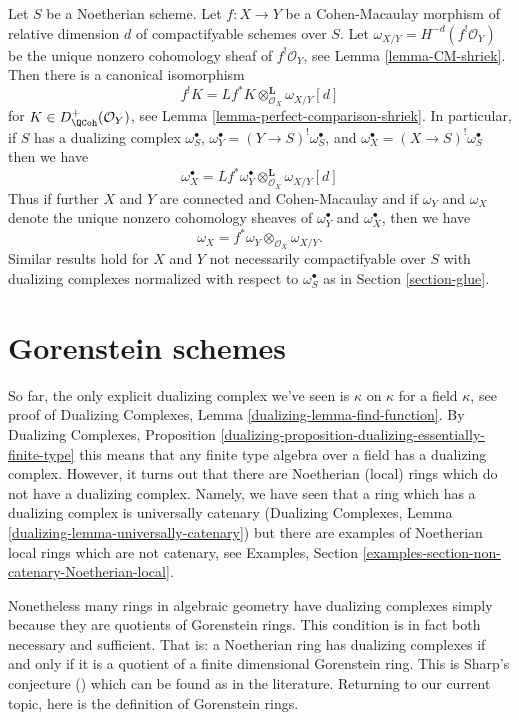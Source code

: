 \begin{remark}
\label{remark-CM-morphism-compare-dualizing}
Let $S$ be a Noetherian scheme. Let $f : X \to Y$ be a
Cohen-Macaulay morphism of relative dimension $d$
of compactifyable schemes over $S$.
Let $\omega_{X/Y} = H^{-d}(f^!\mathcal{O}_Y)$
be the unique nonzero cohomology sheaf of $f^!\mathcal{O}_Y$, see
Lemma \ref{lemma-CM-shriek}.
Then there is a canonical isomorphism
$$
f^!K = Lf^*K \otimes_{\mathcal{O}_X}^\mathbf{L} \omega_{X/Y}[d]
$$
for $K \in D^+_\QCoh(\mathcal{O}_Y)$, see
Lemma \ref{lemma-perfect-comparison-shriek}. In particular, if
$S$ has a dualizing complex $\omega_S^\bullet$,
$\omega_Y^\bullet = (Y \to S)^!\omega_S^\bullet$, and
$\omega_X^\bullet = (X \to S)^!\omega_S^\bullet$
then we have
$$
\omega_X^\bullet =
Lf^*\omega_Y^\bullet \otimes_{\mathcal{O}_X}^\mathbf{L} \omega_{X/Y}[d]
$$
Thus if further $X$ and $Y$ are connected and Cohen-Macaulay and
if $\omega_Y$ and $\omega_X$ denote the unique nonzero cohomology
sheaves of $\omega_Y^\bullet$ and $\omega_X^\bullet$, then we
have
$$
\omega_X = f^*\omega_Y \otimes_{\mathcal{O}_X} \omega_{X/Y}.
$$
Similar results hold for $X$ and $Y$ not necessarily compactifyable
over $S$ with dualizing complexes normalized with respect to
$\omega_S^\bullet$ as in Section \ref{section-glue}.
\end{remark}





\section{Gorenstein schemes}
\label{section-gorenstein}

\noindent
So far, the only explicit dualizing complex we've seen is $\kappa$ on $\kappa$
for a field $\kappa$, see proof of Dualizing Complexes, Lemma
\ref{dualizing-lemma-find-function}.
By Dualizing Complexes, Proposition
\ref{dualizing-proposition-dualizing-essentially-finite-type}
this means that any finite type algebra over a field has a dualizing
complex. However, it turns out that there are Noetherian (local) rings
which do not have a dualizing complex. Namely, we have seen that
a ring which has a dualizing complex is universally catenary
(Dualizing Complexes, Lemma \ref{dualizing-lemma-universally-catenary})
but there are examples of
Noetherian local rings which are not catenary, see
Examples, Section \ref{examples-section-non-catenary-Noetherian-local}.

\medskip\noindent
Nonetheless many rings in algebraic geometry have dualizing complexes
simply because they are quotients of Gorenstein rings. This condition
is in fact both necessary and sufficient. That is: a Noetherian ring
has dualizing complexes if and only if it is a quotient of a finite
dimensional Gorenstein ring. This is Sharp's conjecture (\cite{Sharp})
which can be found as \cite[Corollary 1.4]{Kawasaki} in the literature.
Returning to our current topic, here is the definition of Gorenstein rings.

